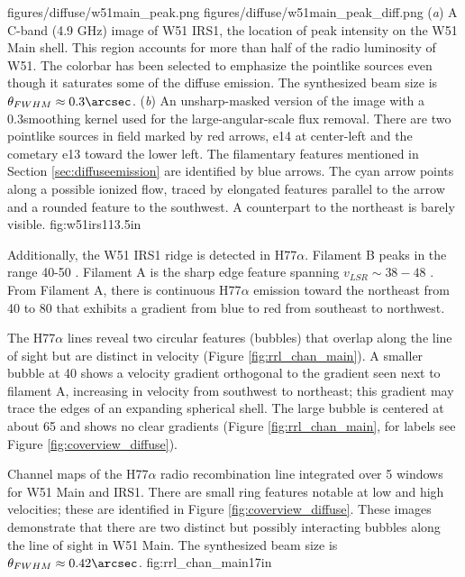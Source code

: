 \FigureTwo
{figures/diffuse/w51main_peak.png}
{figures/diffuse/w51main_peak_diff.png}
{({\it a}) A C-band (4.9 GHz) image of W51 IRS1, the location of peak
intensity on the W51 Main shell.
This region accounts for more than half of the radio luminosity of W51.  The
colorbar has been selected to emphasize the pointlike sources even though it
saturates some of the diffuse emission.  The synthesized beam size
is $\theta_{FWHM}\approx0.3\arcsec$.
({\it b}) An unsharp-masked version of the image with a 0.3\arcsec smoothing
kernel used for the large-angular-scale flux removal. 
There are
two pointlike sources in field marked by red arrows, e14 at center-left and the
cometary e13 toward the lower left.
The filamentary features mentioned in Section \ref{sec:diffuseemission} are
identified by blue arrows.  The cyan arrow points along a possible ionized flow,
traced by elongated features parallel to the arrow and a rounded feature to the
southwest.  A counterpart to the northeast is barely visible.
}
{fig:w51irs1}{1}{3.5in}

Additionally, the W51 IRS1 ridge is detected in H77$\alpha$.  Filament
B peaks in the range 40-50 \kms.  Filament A is the sharp edge feature
spanning $v_{LSR}\sim38-48$ \kms.  From Filament A, there is continuous
H77$\alpha$ emission toward the northeast from 40 to 80 \kms that exhibits a
gradient from blue to red from southeast to northwest.  

The H77$\alpha$ lines reveal two circular features (bubbles) that overlap along
the line of sight but are distinct in velocity (Figure
\ref{fig:rrl_chan_main}).  A smaller bubble at 40 \kms shows a velocity
gradient orthogonal to the gradient seen next to filament A, increasing in
velocity from southwest to northeast; this gradient may trace the edges of an
expanding spherical shell.  The large bubble is centered at about 65 \kms and
shows no clear gradients (Figure \ref{fig:rrl_chan_main}, for
labels see Figure \ref{fig:coverview_diffuse}).

{Channel maps of the H77$\alpha$ radio recombination line integrated over 5 \kms windows
for W51 Main and IRS1.  There are small ring features notable at low and high
velocities; these are identified in Figure \ref{fig:coverview_diffuse}.  These
images demonstrate that there are two distinct but possibly interacting bubbles
along the line of sight in W51 Main.
The synthesized beam size is $\theta_{FWHM}\approx0.42\arcsec$.
}
{fig:rrl_chan_main}{1}{7in}

